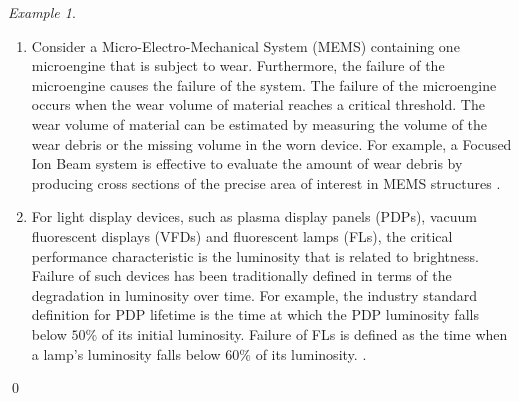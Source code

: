 \documentclass[10pt,a4paper]{article}
\theoremstyle{remark}
\newtheorem{example}{Example}
\begin{document}
\begin{example}\label{ex:Degradation1} \renewcommand{\qedsymbol}{$\lozenge$} \mbox{}  

\begin{enumerate}
\item Consider a Micro-Electro-Mechanical System (MEMS) containing one microengine that is subject to wear.  Furthermore, the failure of the microengine causes the failure of the system.  The failure of the microengine occurs when the wear volume of material reaches a critical threshold.  The wear volume of material can be estimated by measuring the volume of the wear debris or the missing volume in the worn device.  For example, a Focused Ion Beam system is effective to evaluate the amount of wear debris by producing cross sections of the precise area of interest in MEMS structures \cite{PengFengCoit09}.

\item For light display devices, such as plasma display panels (PDPs), vacuum fluorescent displays (VFDs) and fluorescent lamps (FLs), the critical performance characteristic is the luminosity that is related to brightness. Failure of such devices has been traditionally defined in terms of the degradation in luminosity over time. For example, the industry standard definition for PDP lifetime is the time at which the PDP luminosity falls below $50\%$ of its initial luminosity. Failure of FLs is defined as the time when a lamp’s luminosity falls below $60\%$ of its luminosity. \cite{FengPengCoit10}.

\end{enumerate}
\qed
\end{example}

%

\end{document}

